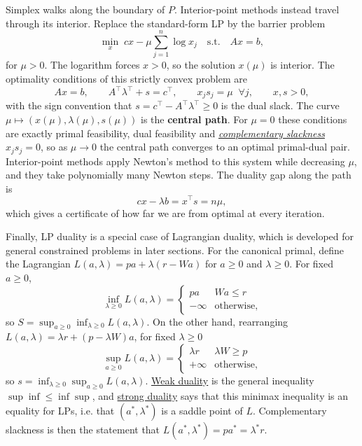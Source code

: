 	Simplex walks along the boundary of $P$. Interior-point methods instead travel through its interior. Replace the standard-form LP by the barrier problem 
	\begin{equation}
		\min_{x} \; cx - \mu \sum_{j=1}^n \log x_j \quad \text{s.t.} \quad Ax = b, 
	\end{equation}
	for $\mu > 0$. The logarithm forces $x > 0$, so the solution $x(\mu)$ is interior. The optimality conditions of this strictly convex problem are 
	\begin{equation}
		Ax = b, \qquad A^\top \lambda^\top + s = c^\top, \qquad x_j s_j = \mu \;\; \forall j, \qquad x, s > 0, 
	\end{equation}
	with the sign convention that $s = c^\top - A^\top \lambda^\top \geq 0$ is the dual slack. The curve $\mu \mapsto (x(\mu), \lambda(\mu), s(\mu))$ is the \textbf{central path}. For $\mu = 0$ these conditions are exactly primal feasibility, dual feasibility and \textit{\hyperref[thm:complementary-slackness]{complementary slackness}} $x_j s_j = 0$, so as $\mu \to 0$ the central path converges to an optimal primal-dual pair. Interior-point methods apply Newton's method to this system while decreasing $\mu$, and they take polynomially many Newton steps. The duality gap along the path is 
	\begin{equation}
		cx - \lambda b = x^\top s = n\mu, 
	\end{equation}
	which gives a certificate of how far we are from optimal at every iteration. 

	Finally, LP duality is a special case of Lagrangian duality, which is developed for general constrained problems in later sections. For the canonical primal, define the Lagrangian $L(a, \lambda) = pa + \lambda(r - Wa)$ for $a \geq 0$ and $\lambda \geq 0$. For fixed $a \geq 0$, 
	\begin{equation}
		\inf_{\lambda \geq 0} L(a, \lambda) = \begin{cases} pa & Wa \leq r \\ -\infty & \text{otherwise,} \end{cases}
	\end{equation}
	so $S = \sup_{a \geq 0} \inf_{\lambda \geq 0} L(a, \lambda)$. On the other hand, rearranging $L(a, \lambda) = \lambda r + (p - \lambda W)a$, for fixed $\lambda \geq 0$ 
	\begin{equation}
		\sup_{a \geq 0} L(a, \lambda) = \begin{cases} \lambda r & \lambda W \geq p \\ +\infty & \text{otherwise,} \end{cases}
	\end{equation}
	so $s = \inf_{\lambda \geq 0} \sup_{a \geq 0} L(a, \lambda)$. \hyperref[thm:weak-duality]{Weak duality} is the general inequality $\sup \inf \leq \inf \sup$, and \hyperref[thm:strong-duality]{strong duality} says that this minimax inequality is an equality for LPs, i.e. that $(a^\ast, \lambda^\ast)$ is a saddle point of $L$. Complementary slackness is then the statement that $L(a^\ast, \lambda^\ast) = pa^\ast = \lambda^\ast r$. 
